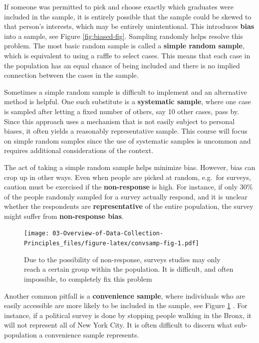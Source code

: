 \documentclass[
]{book}
\begin{document}
If someone was permitted to pick and choose exactly which graduates were included in the sample, it is entirely possible that the sample could be skewed to that person's interests, which may be entirely unintentional. This introduces \textbf{bias} into a sample, see Figure \ref{fig:biased-fig}. Sampling randomly helps resolve this problem. The most basic random sample is called a \textbf{simple random sample}, which is equivalent to using a raffle to select cases. This means that each case in the population has an equal chance of being included and there is no implied connection between the cases in the sample.

Sometimes a simple random sample is difficult to implement and an alternative method is helpful. One such substitute is a \textbf{systematic sample}, where one case is sampled after letting a fixed number of others, say 10 other cases, pass by. Since this approach uses a mechanism that is not easily subject to personal biases, it often yields a reasonably representative sample. This course will focus on simple random samples since the use of systematic samples is uncommon and requires additional considerations of the context.

The act of taking a simple random sample helps minimize bias. However, bias can crop up in other ways. Even when people are picked at random, e.g.~for surveys, caution must be exercised if the \textbf{non-response} is high. For instance, if only 30\% of the people randomly sampled for a survey actually respond, and it is unclear whether the respondents are \textbf{representative} of the entire population, the survey might suffer from \textbf{non-response bias}.

\begin{figure}
\centering
\texttt{[image: 03-Overview-of-Data-Collection-Principles\_files/figure-latex/convsamp-fig-1.pdf]}
\caption{\label{fig:convsamp-fig}Due to the possibility of non-response, surveys studies may only reach a certain group within the population. It is difficult, and often impossible, to completely fix this problem}
\end{figure}

Another common pitfall is a \textbf{convenience sample}, where individuals who are easily accessible are more likely to be included in the sample, see Figure \ref{fig:convsamp-fig} . For instance, if a political survey is done by stopping people walking in the Bronx, it will not represent all of New York City. It is often difficult to discern what sub-population a convenience sample represents.
\end{document}
